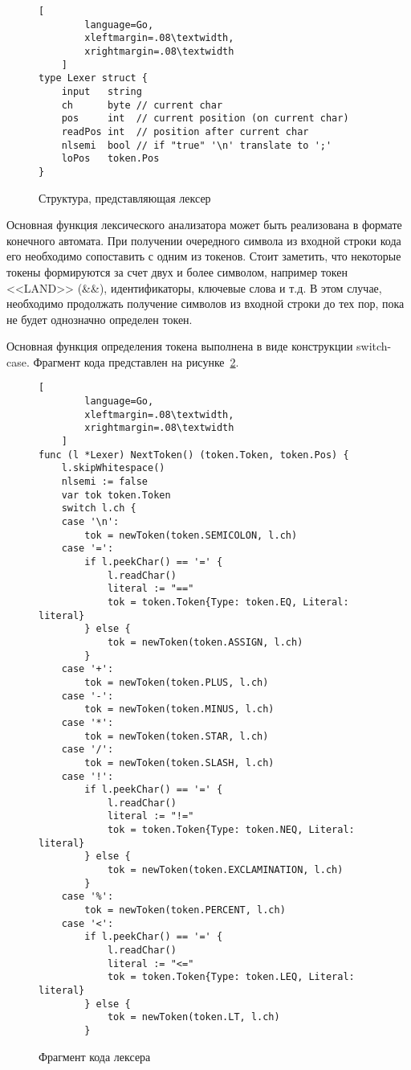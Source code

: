 \begin{figure}[ht]
	\centering
	\vspace{\toppaddingoffigure}
	\begin{lstlisting}[
        language=Go,
        xleftmargin=.08\textwidth,
        xrightmargin=.08\textwidth
    ]
type Lexer struct {
    input   string
    ch      byte // current char
    pos     int  // current position (on current char)
    readPos int  // position after current char
    nlsemi  bool // if "true" '\n' translate to ';'
    loPos   token.Pos
}    
\end{lstlisting}
	\caption{Структура, представляющая лексер}
	\label{f:code_lexerStruct}
\end{figure}

Основная функция лексического анализатора может быть реализована в формате конечного автомата.
При получении очередного символа из входной строки кода его необходимо сопоставить с одним из токенов.
Стоит заметить, что некоторые токены формируются за счет двух и более символом, например токен <<LAND>> (\&\&), идентификаторы, ключевые слова и т.д. 
В этом случае, необходимо продолжать получение символов из входной строки до тех пор, пока не будет однозначно определен токен.

Основная функция определения токена выполнена в виде конструкции switch-case.
Фрагмент кода представлен на рисунке~\ref{f:code_lexerFragment}.

\clearpage

\begin{figure}[!ht]
	\centering
    \begin{lstlisting}[
        language=Go,
        xleftmargin=.08\textwidth,
        xrightmargin=.08\textwidth
    ]
func (l *Lexer) NextToken() (token.Token, token.Pos) {
    l.skipWhitespace()
    nlsemi := false
    var tok token.Token
    switch l.ch {
    case '\n':
        tok = newToken(token.SEMICOLON, l.ch)
    case '=':
        if l.peekChar() == '=' {
            l.readChar()
            literal := "=="
            tok = token.Token{Type: token.EQ, Literal: literal}
        } else {
            tok = newToken(token.ASSIGN, l.ch)
        }
    case '+':
        tok = newToken(token.PLUS, l.ch)
    case '-':
        tok = newToken(token.MINUS, l.ch)
    case '*':
        tok = newToken(token.STAR, l.ch)
    case '/':
        tok = newToken(token.SLASH, l.ch)
    case '!':
        if l.peekChar() == '=' {
            l.readChar()
            literal := "!="
            tok = token.Token{Type: token.NEQ, Literal: literal}
        } else {
            tok = newToken(token.EXCLAMINATION, l.ch)
        }
    case '%':
		tok = newToken(token.PERCENT, l.ch)
	case '<':
		if l.peekChar() == '=' {
			l.readChar()
			literal := "<="
			tok = token.Token{Type: token.LEQ, Literal: literal}
		} else {
			tok = newToken(token.LT, l.ch)
		}
\end{lstlisting}
	\caption{Фрагмент кода лексера}
	\label{f:code_lexerFragment}
\end{figure}